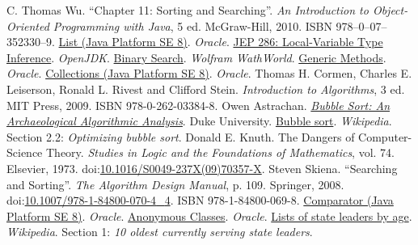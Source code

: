 \documentclass[a4paper,12pt]{article}
\begin{document}
\begin{thebibliography}{99}
   C. Thomas Wu.
    ``Chapter 11: Sorting and Searching''.
    \emph{An Introduction to Object-Oriented Programming with Java}, 5 ed.
    McGraw-Hill, 2010.  ISBN 978–0–07–352330–9.
   \href{https://docs.oracle.com/javase/8/docs/api/java/util/List.html}{List (Java Platform SE 8)}.
    \emph{Oracle}.
   \href{http://openjdk.java.net/jeps/286}{JEP 286: Local-Variable Type Inference}.
    \emph{OpenJDK}.
   \href{http://mathworld.wolfram.com/BinarySearch.html}{Binary Search}.
    \emph{Wolfram WathWorld}.
   \href{https://docs.oracle.com/javase/tutorial/java/generics/methods.html}{Generic Methods}.
    \emph{Oracle}.
   \href{https://docs.oracle.com/javase/8/docs/api/java/util/Collections.html}{Collections (Java Platform SE 8)}.
    \emph{Oracle}.
   Thomas H. Cormen, Charles E. Leiserson,
                 Ronald L. Rivest and Clifford Stein.
    \emph{Introduction to Algorithms}, 3 ed.
    MIT Press, 2009.  ISBN 978-0-262-03384-8.
   Owen Astrachan.
    \emph{\href{https://users.cs.duke.edu/~ola/bubble/bubble.html}{Bubble Sort: An Archaeological Algorithmic Analysis}}.
    Duke University.
   \href{https://en.wikipedia.org/wiki/Bubble_sort#Optimizing_bubble_sort}{Bubble sort}.
    \emph{Wikipedia}.
    Section 2.2: \emph{Optimizing bubble sort}.
   Donald E. Knuth.  The Dangers of Computer-Science Theory.
    \emph{Studies in Logic and the Foundations of Mathematics}, vol. 74.
    Elsevier, 1973.
    doi:\href{https://doi.org/10.1016/S0049-237X(09)70357-X}{10.1016/S0049-237X(09)70357-X}.
   Steven Skiena.
    ``Searching and Sorting''.
    \emph{The Algorithm Design Manual}, p. 109.
    Springer, 2008.
    doi:\href{https://doi.org/10.1007/978-1-84800-070-4_4}{10.1007/978-1-84800-070-4{\_}4}.
    ISBN 978-1-84800-069-8.
   \href{https://docs.oracle.com/javase/8/docs/api/java/util/mparator.html}{Comparator (Java Platform SE 8)}.
    \emph{Oracle}.
   \href{https://docs.oracle.com/javase/tutorial/java/javaOO/anonymousclasses.html}{Anonymous Classes}.
    \emph{Oracle}.
   \href{https://en.wikipedia.org/wiki/Lists_of_state_leaders_by_age#10_oldest_currently_serving_state_leaders}{Lists of state leaders by age}.
    \emph{Wikipedia}.
    Section 1: \emph{10 oldest currently serving state leaders}.
\end{thebibliography}
\end{document}
